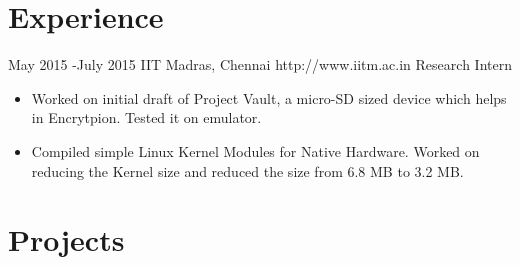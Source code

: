 \documentclass[10pt]{article} %
\begin{document}
\section{Experience}

\job
{May 2015 -}{July 2015}
{IIT Madras, Chennai}
{http://www.iitm.ac.in}
{Research Intern}

\begin{itemize}
\item {Worked on initial draft of Project Vault, a micro-SD sized device which helps in Encrytpion. Tested it on emulator.}
\item{Compiled simple Linux Kernel Modules for Native Hardware. Worked on reducing the Kernel size and reduced the size from 6.8 MB to 3.2 MB.}
\end{itemize}


\section{Projects}
\end{document}
